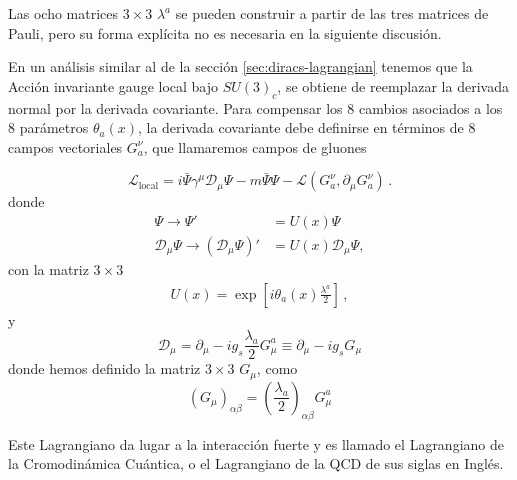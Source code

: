 Las ocho matrices $3\times3$ $\lambda^a$ se pueden construir a partir de las tres matrices de Pauli, pero su forma explícita no es necesaria en la siguiente discusión.

En un análisis similar al de la sección \ref{sec:diracs-lagrangian} tenemos que la Acción invariante gauge local bajo $SU(3)_c$, se obtiene de reemplazar la derivada normal por la derivada covariante. Para compensar los 8 cambios asociados a los 8 parámetros $\theta_a(x)$, la derivada covariante debe definirse en términos de 8 campos vectoriales $G^\nu_a$, que llamaremos campos de gluones
\begin{frame}%
\begin{equation}
  \label{eq:127qft}
  \mathcal{L}_{\text{local}}=i\bar{\Psi}\gamma^\mu\mathcal{D}_\mu\Psi-m\bar{\Psi}\Psi
  -\mathcal{L}\left( G^{\nu}_{a},\partial_{\mu}G^{\nu}_{a} \right)\,.%
\end{equation}
donde
\begin{align}
  \label{eq:qcdtr}
  \Psi\to \Psi'&=U(x)\Psi\nonumber\\
  \mathcal{D}_\mu\Psi\to \left(\mathcal{D}_\mu\Psi\right)'&
  =U(x)\mathcal{D}_\mu\Psi,
\end{align}
con la matriz $3\times 3$
\begin{align}
  U(x)=\exp\left[i\theta_a(x)\frac{\lambda^a}{2}\right]\,,
\end{align}
y
\begin{equation}
  \mathcal{D}_\mu=\partial_\mu-i g_s\frac{\lambda_a}{2}G_\mu^a\equiv\partial_\mu-i g_s {G}_\mu
\end{equation}
donde hemos definido la matriz $3\times 3$  $G_\mu$, como
\begin{equation}
  \left({G}_\mu\right)_{\alpha\beta}=\left(\frac{\lambda_a}{2}\right)_{\alpha\beta}G_\mu^a
\end{equation}
\end{frame}
Este Lagrangiano da lugar a la interacción fuerte y es llamado el Lagrangiano de la Cromodinámica Cuántica, o el Lagrangiano de la QCD de sus siglas en Inglés.

